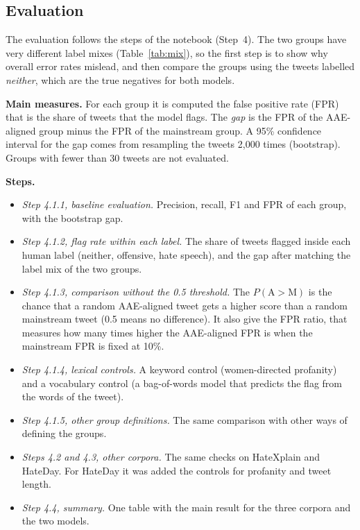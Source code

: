 \documentclass[runningheads,a4paper,oribibl]{llncs}
\begin{document}
\subsection{Evaluation}\label{sec:evaluation}
The evaluation follows the steps of the notebook (Step~4). The two groups have very different label
mixes (Table~\ref{tab:mix}), so the first step is to show why overall error rates mislead, and
then compare the groups using the tweets labelled \emph{neither}, which are the true negatives
for both models.

\textbf{Main measures.} For each group it is computed the false positive rate (FPR) that is the
share of tweets that the model flags. The \emph{gap} is the FPR of the AAE-aligned group minus
the FPR of the mainstream group. A 95\% confidence interval for the gap comes from resampling
the tweets 2,000 times (bootstrap). Groups with fewer than 30 tweets are not evaluated.

\textbf{Steps.}
\begin{itemize}
  \item \emph{Step 4.1.1, baseline evaluation.} Precision, recall, F1 and FPR of each group,
    with the bootstrap gap.
  \item \emph{Step 4.1.2, flag rate within each label.} The share of tweets flagged inside each
    human label (neither, offensive, hate speech), and the gap after matching the label mix
    of the two groups.
  \item \emph{Step 4.1.3, comparison without the 0.5 threshold.} The $P(\mathrm{A}{>}\mathrm{M})$
    is the chance that a random AAE-aligned tweet gets a higher score than a random mainstream
    tweet (0.5 means no difference). It also give the FPR ratio, that measures how many times
    higher the AAE-aligned FPR is when the mainstream FPR is fixed at 10\%.
  \item \emph{Step 4.1.4, lexical controls.} A keyword control (women-directed profanity) and
    a vocabulary control (a bag-of-words model that predicts the flag from the words of the
    tweet).
  \item \emph{Step 4.1.5, other group definitions.} The same comparison with other ways of
    defining the groups.
  \item \emph{Steps 4.2 and 4.3, other corpora.} The same checks on HateXplain and HateDay.
    For HateDay it was added the controls for profanity and tweet length.
  \item \emph{Step 4.4, summary.} One table with the main result for the three corpora and
    the two models.
\end{itemize}
\end{document}
